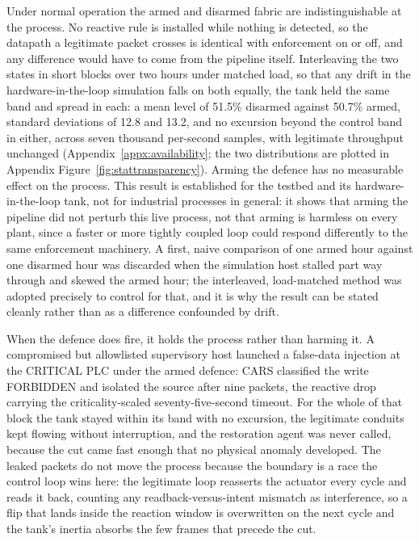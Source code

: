 Under normal operation the armed and disarmed fabric are indistinguishable at the process. No reactive rule is installed while nothing is detected, so the datapath a legitimate packet crosses is identical with enforcement on or off, and any difference would have to come from the pipeline itself. Interleaving the two states in short blocks over two hours under matched load, so that any drift in the hardware-in-the-loop simulation falls on both equally, the tank held the same band and spread in each: a mean level of 51.5\% disarmed against 50.7\% armed, standard deviations of 12.8 and 13.2, and no excursion beyond the control band in either, across seven thousand per-second samples, with legitimate throughput unchanged (Appendix~\ref{appx:availability}; the two distributions are plotted in Appendix Figure~\ref{fig:stattransparency}). Arming the defence has no measurable effect on the process. This result is established for the testbed and its hardware-in-the-loop tank, not for industrial processes in general: it shows that arming the pipeline did not perturb this live process, not that arming is harmless on every plant, since a faster or more tightly coupled loop could respond differently to the same enforcement machinery. A first, naive comparison of one armed hour against one disarmed hour was discarded when the simulation host stalled part way through and skewed the armed hour; the interleaved, load-matched method was adopted precisely to control for that, and it is why the result can be stated cleanly rather than as a difference confounded by drift.

When the defence does fire, it holds the process rather than harming it. A compromised but allowlisted supervisory host launched a false-data injection at the CRITICAL PLC under the armed defence: CARS classified the write FORBIDDEN and isolated the source after nine packets, the reactive drop carrying the criticality-scaled seventy-five-second timeout. For the whole of that block the tank stayed within its band with no excursion, the legitimate conduits kept flowing without interruption, and the restoration agent was never called, because the cut came fast enough that no physical anomaly developed. The leaked packets do not move the process because the boundary is a race the control loop wins here: the legitimate loop reasserts the actuator every cycle and reads it back, counting any readback-versus-intent mismatch as interference, so a flip that lands inside the reaction window is overwritten on the next cycle and the tank's inertia absorbs the few frames that precede the cut.

